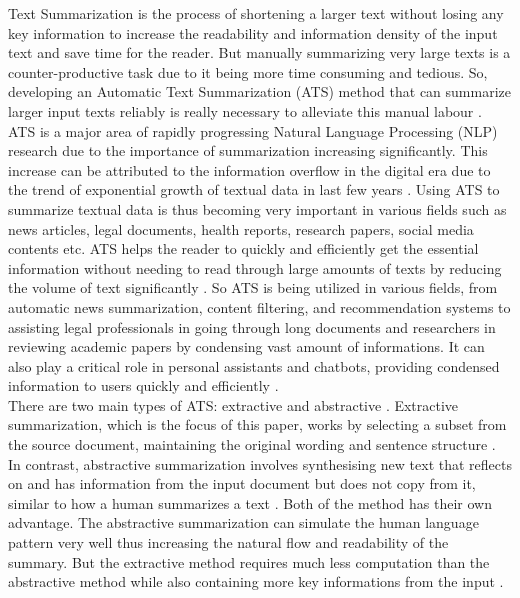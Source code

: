 Text Summarization is the process of shortening a larger text without losing any key information to increase the readability and information density of the input text and save time for the reader. But manually summarizing very large texts is a counter-productive task due to it being more time consuming and tedious. So, developing an Automatic Text Summarization (ATS) method that can summarize larger input texts reliably is really necessary to alleviate this manual labour \cite{Widyassari-2022-rev-ats-tech-met}. ATS is a major area of rapidly progressing Natural Language Processing (NLP) research due to the importance of summarization increasing significantly. This increase can be attributed to the information overflow in the digital era due to the trend of exponential growth of textual data in last few years \cite{2015-Forbes-80-created-last-2-years}. Using ATS to summarize textual data is thus becoming very important in various fields such as news articles, legal documents, health reports, research papers, social media contents etc. ATS helps the reader to quickly and efficiently get the essential information without needing to read through large amounts of texts by reducing the volume of text significantly \cite{wafaa-2021-summary-comprehensive-review}. So ATS is being utilized in various fields, from automatic news summarization, content filtering, and recommendation systems to assisting legal professionals in going through long documents and researchers in reviewing academic papers by condensing vast amount of informations. It can also play a critical role in personal assistants and chatbots, providing condensed information to users quickly and efficiently \cite{tas-2017-rev-text-sum-2}.\\

There are two main types of ATS: extractive and abstractive \cite{tas-2017-rev-text-sum-2}. Extractive summarization, which is the focus of this paper, works by selecting a subset from the source document, maintaining the original wording and sentence structure \cite{moratanch-2017-extractive-review}. In contrast, abstractive summarization involves synthesising new text that reflects on and has information from the input document but does not copy from it, similar to how a human summarizes a text \cite{Moratanch-2016-abstractive-rev}. Both of the method has their own advantage. The abstractive summarization can simulate the human language pattern very well thus increasing the natural flow and readability of the summary. But the extractive method requires much less computation than the abstractive method while also containing more key informations from the input \cite{gupta-2010-extractive-rev}.\\ 

